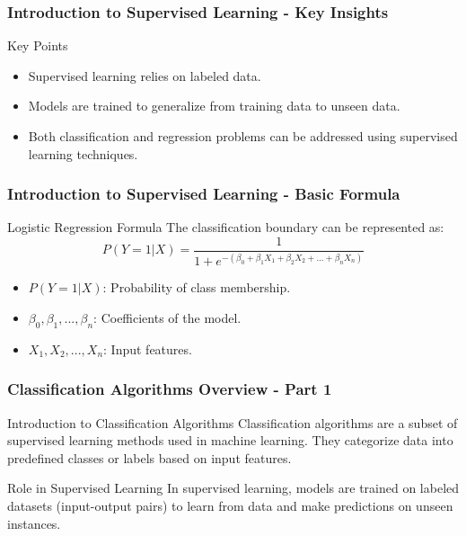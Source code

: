\documentclass[aspectratio=169]{beamer}
\begin{document}
\begin{frame}[fragile]
    \frametitle{Introduction to Supervised Learning - Key Insights}
    \begin{block}{Key Points}
        \begin{itemize}
            \item Supervised learning relies on labeled data.
            \item Models are trained to generalize from training data to unseen data.
            \item Both classification and regression problems can be addressed using supervised learning techniques.
        \end{itemize}
    \end{block}
\end{frame}

\begin{frame}[fragile]
    \frametitle{Introduction to Supervised Learning - Basic Formula}
    \begin{block}{Logistic Regression Formula}
        The classification boundary can be represented as:
        \begin{equation}
            P(Y=1 | X) = \frac{1}{1 + e^{-(\beta_0 + \beta_1X_1 + \beta_2X_2 + ... + \beta_nX_n)}}
        \end{equation}
        \begin{itemize}
            \item $P(Y=1 | X)$: Probability of class membership.
            \item $\beta_0, \beta_1, ..., \beta_n$: Coefficients of the model.
            \item $X_1, X_2, ..., X_n$: Input features.
        \end{itemize}
    \end{block}
\end{frame}

\begin{frame}[fragile]
    \frametitle{Classification Algorithms Overview - Part 1}
    \begin{block}{Introduction to Classification Algorithms}
        Classification algorithms are a subset of supervised learning methods used in machine learning. They categorize data into predefined classes or labels based on input features. 
    \end{block}
    \begin{block}{Role in Supervised Learning}
        In supervised learning, models are trained on labeled datasets (input-output pairs) to learn from data and make predictions on unseen instances. 
    \end{block}
\end{frame}
\end{document}
